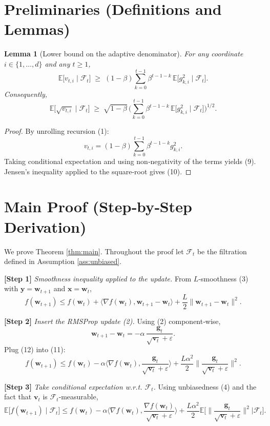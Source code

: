 \documentclass{article}
\newtheorem{lemma}{Lemma}
\newcommand{\EE}{\mathbb{E}}
\begin{document}
\newpage
\section*{Preliminaries (Definitions and Lemmas)}
\begin{lemma}[Lower bound on the adaptive denominator]\label{lem:vt-lower}
For any coordinate $i\in\{1,\dots,d\}$ and any $t\ge1$,
\[
\EE\!\big[ v_{t,i}\mid\mathcal{F}_{t}\big]\;\ge\;(1-\beta)\sum_{k=0}^{t-1}\beta^{t-1-k}\,
\EE\!\big[ g_{k,i}^{2}\mid\mathcal{F}_{t}\big].
\tag{9}
\]
Consequently,
\[
\EE\!\big[ \sqrt{v_{t,i}} \mid\mathcal{F}_{t}\big]
\;\ge\;\sqrt{1-\beta}\,
\Big(\sum_{k=0}^{t-1}\beta^{t-1-k}\,
\EE\!\big[g_{k,i}^{2}\mid\mathcal{F}_{t}\big]\Big)^{\!1/2}.
\tag{10}
\]
\end{lemma}
\begin{proof}
By unrolling recursion (1):
\[
v_{t,i}= (1-\beta)\sum_{k=0}^{t-1}\beta^{t-1-k}g_{k,i}^{2}.
\]
Taking conditional expectation and using non‑negativity of the terms yields (9). Jensen’s inequality applied to the square‑root gives (10). \hfill\qedsymbol
\end{proof}

\section*{Main Proof (Step‑by‑Step Derivation)}
We prove Theorem \ref{thm:main}. Throughout the proof let $\mathcal{F}_{t}$ be the filtration defined in Assumption \ref{ass:unbiased}.

\bigskip
\noindent\textbf{[Step 1]} \emph{Smoothness inequality applied to the update.}  
From $L$‑smoothness (3) with $\bm y=\bm w_{t+1}$ and $\bm x=\bm w_{t}$,
\[
f(\bm w_{t+1})\le f(\bm w_{t})+\langle\nabla f(\bm w_{t}),\bm w_{t+1}-\bm w_{t}\rangle
+\frac{L}{2}\|\bm w_{t+1}-\bm w_{t}\|^{2}.
\tag{11}
\]

\noindent\textbf{[Step 2]} \emph{Insert the RMSProp update (2).}  
Using (2) component‑wise,
\[
\bm w_{t+1}-\bm w_{t}= -\alpha\,
\frac{\bm g_{t}}{\sqrt{\bm v_{t}}+\varepsilon}.
\tag{12}
\]
Plug (12) into (11):
\[
f(\bm w_{t+1})\le f(\bm w_{t})
-\alpha\Big\langle\nabla f(\bm w_{t}),\frac{\bm g_{t}}{\sqrt{\bm v_{t}}+\varepsilon}\Big\rangle
+\frac{L\alpha^{2}}{2}\Big\|\frac{\bm g_{t}}{\sqrt{\bm v_{t}}+\varepsilon}\Big\|^{2}.
\tag{13}
\]

\noindent\textbf{[Step 3]} \emph{Take conditional expectation w.r.t. $\mathcal{F}_{t}$.}  
Using unbiasedness (4) and the fact that $\bm v_{t}$ is $\mathcal{F}_{t}$‑measurable,
\[
\EE\!\big[f(\bm w_{t+1})\mid\mathcal{F}_{t}\big]
\le f(\bm w_{t})
-\alpha\Big\langle\nabla f(\bm w_{t}),\frac{\nabla f(\bm w_{t})}{\sqrt{\bm v_{t}}+\varepsilon}\Big\rangle
+\frac{L\alpha^{2}}{2}\EE\!\Big[\Big\|\frac{\bm g_{t}}{\sqrt{\bm v_{t}}+\varepsilon}\Big\|^{2}\Big|\mathcal{F}_{t}\Big].
\tag{14}
\]
\end{document}
